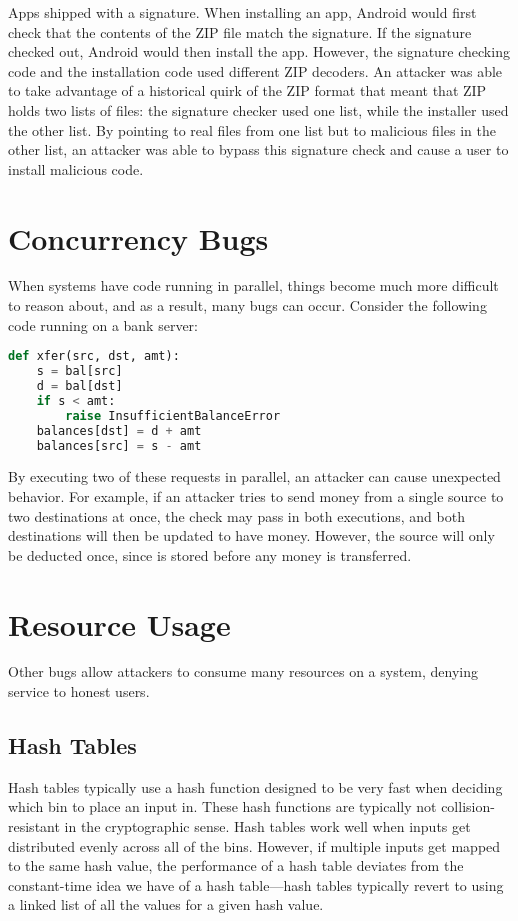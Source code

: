 Apps shipped with a signature. When installing an app, Android would first check that the contents of the ZIP file match the signature. If the signature checked out, Android would then install the app. However, the signature checking code and the installation code used different ZIP decoders. An attacker was able to take advantage of a historical quirk of the ZIP format that meant that ZIP holds two lists of files: the signature checker used one list, while the installer used the other list. By pointing to real files from one list but to malicious files in the other list, an attacker was able to bypass this signature check and cause a user to install malicious code.

\section{Concurrency Bugs}
When systems have code running in parallel, things become much more difficult to reason about, and as a result, many bugs can occur. Consider the following code running on a bank server:

\begin{lstlisting}[language=python]
def xfer(src, dst, amt):
	s = bal[src]
	d = bal[dst]
	if s < amt:
		raise InsufficientBalanceError
	balances[dst] = d + amt
	balances[src] = s - amt
\end{lstlisting}

By executing two of these  requests in parallel, an attacker can cause unexpected behavior. For example, if an attacker tries to send money from a single source to two destinations at once, the check  may pass in both executions, and both destinations will then be updated to have money. However, the source will only be deducted once, since  is stored before any money is transferred.

\section{Resource Usage}
Other bugs allow attackers to consume many resources on a system, denying service to honest users.

\subsection{Hash Tables}
Hash tables typically use a hash function designed to be very fast when deciding which bin to place an input in. These hash functions are typically not collision-resistant in the cryptographic sense. Hash tables work well when inputs get distributed evenly across all of the bins. However, if multiple inputs get mapped to the same hash value, the performance of a hash table deviates from the constant-time idea we have of a hash table---hash tables typically revert to using a linked list of all the values for a given hash value.

